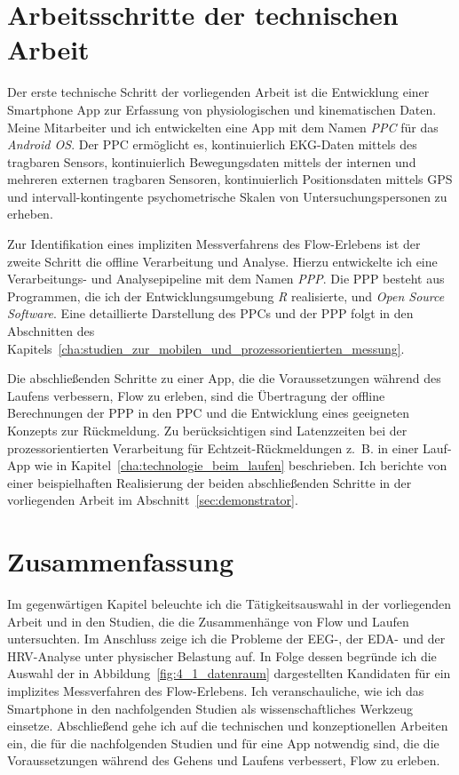 \section{Arbeitsschritte der technischen Arbeit}
\label{sec:arbeitsschritte_der_technischen_arbeit}
Der erste technische Schritt der vorliegenden Arbeit ist die Entwicklung einer Smartphone App zur Erfassung von physiologischen und kinematischen Daten. Meine Mitarbeiter und ich entwickelten eine App mit dem Namen \emph{\ac{PPC}} für das \emph{Android OS}. Der \ac{PPC} ermöglicht es, kontinuierlich \ac{EKG}-Daten mittels des tragbaren Sensors, kontinuierlich Bewegungsdaten mittels der internen und mehreren externen tragbaren Sensoren, kontinuierlich Positionsdaten mittels \ac{GPS} und intervall-kontingente psychometrische Skalen von Untersuchungspersonen zu erheben.

Zur Identifikation eines impliziten Messverfahrens des Flow-Erlebens ist der zweite Schritt die offline Verarbeitung und Analyse. Hierzu entwickelte ich eine Verarbeitungs- und Analysepipeline mit dem Namen \emph{\ac{PPP}}. Die \ac{PPP} besteht aus Programmen, die ich der Entwicklungsumgebung \emph{R} realisierte, und \emph{Open Source Software}. Eine detaillierte Darstellung des \ac{PPC}s und der \ac{PPP} folgt in den Abschnitten des Kapitels~\ref{cha:studien_zur_mobilen_und_prozessorientierten_messung}.

Die abschließenden Schritte zu einer App, die die Voraussetzungen während des Laufens verbessern, Flow zu erleben, sind die Übertragung der offline Berechnungen der \ac{PPP} in den \ac{PPC} und die Entwicklung eines geeigneten Konzepts zur Rückmeldung. Zu berücksichtigen sind Latenzzeiten bei der prozessorientierten Verarbeitung für Echtzeit-Rückmeldungen z.~B. in einer Lauf-App wie in Kapitel~\ref{cha:technologie_beim_laufen} beschrieben. Ich berichte von einer beispielhaften Realisierung der beiden abschließenden Schritte in der vorliegenden Arbeit im Abschnitt~\ref{sec:demonstrator}.

\section{Zusammenfassung}
\label{sec:zusammenfassung_4}
Im gegenwärtigen Kapitel beleuchte ich die Tätigkeitsauswahl in der vorliegenden Arbeit und in den Studien, die die Zusammenhänge von Flow und Laufen untersuchten. Im Anschluss zeige ich die Probleme der \ac{EEG}-, der \ac{EDA}- und der \ac{HRV}-Analyse unter physischer Belastung auf. In Folge dessen begründe ich die Auswahl der in Abbildung~\ref{fig:4_1_datenraum} dargestellten Kandidaten für ein implizites Messverfahren des Flow-Erlebens. Ich veranschauliche, wie ich das Smartphone in den nachfolgenden Studien als wissenschaftliches Werkzeug einsetze. Abschließend gehe ich auf die technischen und konzeptionellen Arbeiten ein, die für die nachfolgenden Studien und für eine App notwendig sind, die die Voraussetzungen während des Gehens und Laufens verbessert, Flow zu erleben.